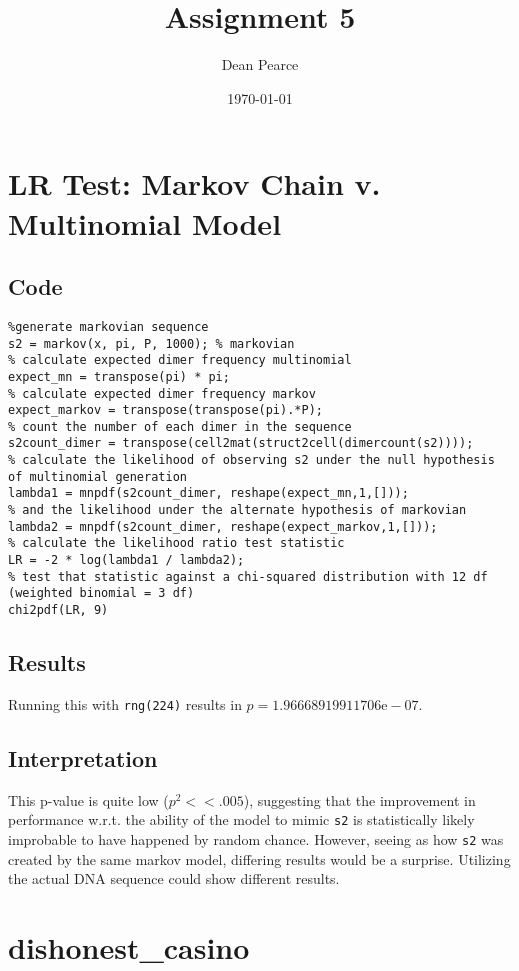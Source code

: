 \documentclass[titlepage]{scrartcl}
\title{Assignment 5}
\date{\today}
\author{Dean Pearce}
\begin{document}
\maketitle
\section{LR Test: Markov Chain v. Multinomial Model}
\subsection{Code}
\begin{verbatim}
%generate markovian sequence
s2 = markov(x, pi, P, 1000); % markovian
% calculate expected dimer frequency multinomial
expect_mn = transpose(pi) * pi;
% calculate expected dimer frequency markov
expect_markov = transpose(transpose(pi).*P);
% count the number of each dimer in the sequence
s2count_dimer = transpose(cell2mat(struct2cell(dimercount(s2))));
% calculate the likelihood of observing s2 under the null hypothesis of multinomial generation
lambda1 = mnpdf(s2count_dimer, reshape(expect_mn,1,[]));
% and the likelihood under the alternate hypothesis of markovian
lambda2 = mnpdf(s2count_dimer, reshape(expect_markov,1,[]));
% calculate the likelihood ratio test statistic
LR = -2 * log(lambda1 / lambda2);
% test that statistic against a chi-squared distribution with 12 df (weighted binomial = 3 df)
chi2pdf(LR, 9)
\end{verbatim}
\subsection{Results}
Running this with \verb+rng(224)+ results in $p=1.96668919911706\text{e}-07$.
\subsection{Interpretation}
This p-value is quite low ($p^2<<.005$), suggesting that the improvement in performance w.r.t. the ability of the model to mimic \verb+s2+ is statistically likely improbable to have happened by random chance.  However, seeing as how \verb+s2+ was created by the same markov model, differing results would be a surprise.  Utilizing the actual DNA sequence could show different results.
\section{dishonest\_casino}
\end{document}
